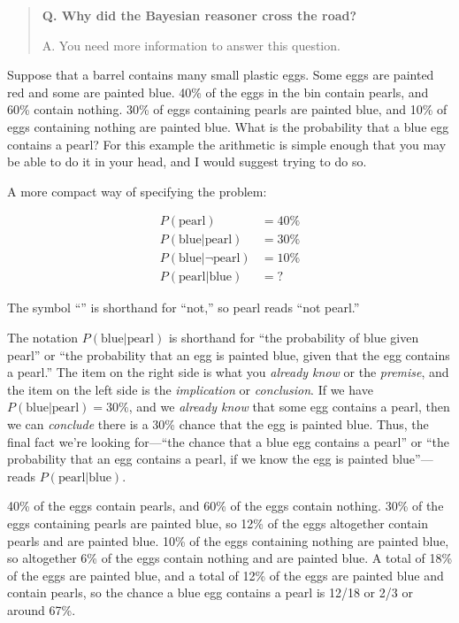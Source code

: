 {{\hr

\begin{quote}
{
 \textbf{Q. Why did the Bayesian reasoner cross the road?}}

{
  A. You need more information to answer this question.}
\end{quote}

\hr

{
 Suppose that a barrel contains many small plastic eggs. Some eggs
are painted red and some are painted blue. 40\% of the eggs in the bin
contain pearls, and 60\% contain nothing. 30\% of eggs containing
pearls are painted blue, and 10\% of eggs containing nothing are
painted blue. What is the probability that a blue egg contains a pearl?
For this example the arithmetic is simple enough that you may be able
to do it in your head, and I would suggest trying to do so.}

{
 A more compact way of specifying the problem:}

\begin{align*}
 P(\text{pearl}) &= 40\% \\
 P(\text{blue}|\text{pearl}) &= 30\% \\
 P(\text{blue}|\lnot\text{pearl}) &= 10\% \\
 P(\text{pearl}|\text{blue}) &= ?
\end{align*}


{
 The symbol ``{\textlnot}'' is
shorthand for ``not,'' so
{\textlnot}pearl reads ``not
pearl.''}

{
 The notation $P(\text{blue}|\text{pearl})$ is shorthand for
``the probability of blue given
pearl'' or ``the probability that an
egg is painted blue, given that the egg contains a
pearl.'' The item on the right side is what you
\textit{already know} or the \textit{premise}, and the item on the left
side is the \textit{implication} or \textit{conclusion}. If we have
$P(\text{blue}|\text{pearl}) = 30\%$, and we \textit{already know} that some
egg contains a pearl, then we can \textit{conclude} there is a 30\%
chance that the egg is painted blue. Thus, the final fact
we're looking for---``the chance that
a blue egg contains a pearl'' or
``the probability that an egg contains a pearl, if we
know the egg is painted blue''---reads
$P(\text{pearl}|\text{blue})$.}

{
 40\% of the eggs contain pearls, and 60\% of the eggs contain
nothing. 30\% of the eggs containing pearls are painted blue, so 12\%
of the eggs altogether contain pearls and are painted blue. 10\% of the
eggs containing nothing are painted blue, so altogether 6\% of the eggs
contain nothing and are painted blue. A total of 18\% of the eggs are
painted blue, and a total of 12\% of the eggs are painted blue and
contain pearls, so the chance a blue egg contains a pearl is 12/18 or
2/3 or around 67\%.}

}}
